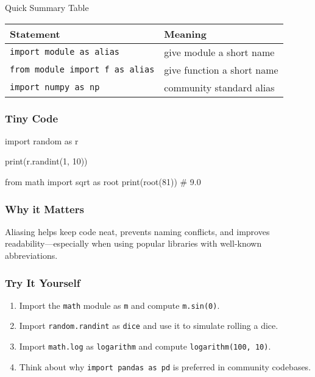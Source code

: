 \documentclass[
  letterpaper,
  DIV=11,
  numbers=noendperiod]{scrreprt}
\newenvironment{Shaded}{\begin{snugshade}}{\end{snugshade}}
\newcommand{\BuiltInTok}[1]{\textcolor[rgb]{0.00,0.23,0.31}{#1}}
\newcommand{\CommentTok}[1]{\textcolor[rgb]{0.37,0.37,0.37}{#1}}
\newcommand{\DecValTok}[1]{\textcolor[rgb]{0.68,0.00,0.00}{#1}}
\newcommand{\ImportTok}[1]{\textcolor[rgb]{0.00,0.46,0.62}{#1}}
\newcommand{\NormalTok}[1]{\textcolor[rgb]{0.00,0.23,0.31}{#1}}
\providecommand{\tightlist}{%
  \setlength{\itemsep}{0pt}\setlength{\parskip}{0pt}}
\begin{document}
Quick Summary Table

\begin{longtable}[]{@{}ll@{}}
\toprule\noalign{}
Statement & Meaning \\
\midrule\noalign{}
\endhead
\bottomrule\noalign{}
\endlastfoot
\texttt{import\ module\ as\ alias} & give module a short name \\
\texttt{from\ module\ import\ f\ as\ alias} & give function a short
name \\
\texttt{import\ numpy\ as\ np} & community standard alias \\
\end{longtable}

\subsubsection{Tiny Code}\label{tiny-code-42}

\begin{Shaded}
\begin{Highlighting}[]
\ImportTok{import}\NormalTok{ random }\ImportTok{as}\NormalTok{ r}

\BuiltInTok{print}\NormalTok{(r.randint(}\DecValTok{1}\NormalTok{, }\DecValTok{10}\NormalTok{))}

\ImportTok{from}\NormalTok{ math }\ImportTok{import}\NormalTok{ sqrt }\ImportTok{as}\NormalTok{ root}
\BuiltInTok{print}\NormalTok{(root(}\DecValTok{81}\NormalTok{))   }\CommentTok{\# 9.0}
\end{Highlighting}
\end{Shaded}

\subsubsection{Why it Matters}\label{why-it-matters-42}

Aliasing helps keep code neat, prevents naming conflicts, and improves
readability---especially when using popular libraries with well-known
abbreviations.

\subsubsection{Try It Yourself}\label{try-it-yourself-42}

\begin{enumerate}
\def\labelenumi{\arabic{enumi}.}
\tightlist
\item
  Import the \texttt{math} module as \texttt{m} and compute
  \texttt{m.sin(0)}.
\item
  Import \texttt{random.randint} as \texttt{dice} and use it to simulate
  rolling a dice.
\item
  Import \texttt{math.log} as \texttt{logarithm} and compute
  \texttt{logarithm(100,\ 10)}.
\item
  Think about why \texttt{import\ pandas\ as\ pd} is preferred in
  community codebases.
\end{enumerate}
\end{document}
